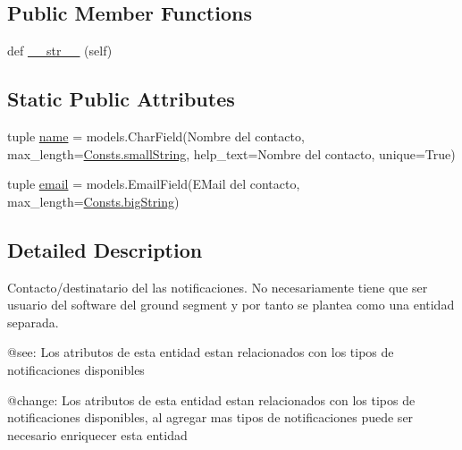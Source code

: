 \subsection*{Public Member Functions}
\begin{DoxyCompactItemize}
\item 
def \hyperlink{class_ground_segment_1_1models_1_1_notification_1_1_contact_1_1_contact_a45cbc85e87d16968f4825f37643dfcbc}{\+\_\+\+\_\+str\+\_\+\+\_\+} (self)
\end{DoxyCompactItemize}
\subsection*{Static Public Attributes}
\begin{DoxyCompactItemize}
\item 
tuple \hyperlink{class_ground_segment_1_1models_1_1_notification_1_1_contact_1_1_contact_a3400aa7d4127f75c2035ab4ae66831fa}{name} = models.\+Char\+Field(\textquotesingle{}Nombre del contacto\textquotesingle{}, max\+\_\+length=\hyperlink{class_ground_segment_1_1models_1_1_consts_1_1_consts_a3788d24e86a0ffb03efc2a6bb1f88643}{Consts.\+small\+String}, help\+\_\+text=\textquotesingle{}Nombre del contacto\textquotesingle{}, unique=True)
\item 
tuple \hyperlink{class_ground_segment_1_1models_1_1_notification_1_1_contact_1_1_contact_a9a68391275195d525ab02505794e162f}{email} = models.\+Email\+Field(\textquotesingle{}E\+Mail del contacto\textquotesingle{}, max\+\_\+length=\hyperlink{class_ground_segment_1_1models_1_1_consts_1_1_consts_a50658f4d6bc00d2768a7228e7fd631ba}{Consts.\+big\+String})
\end{DoxyCompactItemize}


\subsection{Detailed Description}
\begin{DoxyVerb}Contacto/destinatario del las notificaciones. No necesariamente tiene que ser usuario del software del ground segment
y por tanto se plantea como una entidad separada.


@see: Los atributos de esta entidad estan relacionados con los tipos de notificaciones disponibles

@change: Los atributos de esta entidad estan relacionados con los tipos de notificaciones disponibles, al agregar mas tipos 
de notificaciones puede ser necesario enriquecer esta entidad
\end{DoxyVerb}
 

